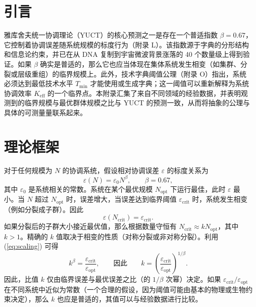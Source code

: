 \documentclass[12pt]{article}
\theoremstyle{remark}
\newcommand{\Keff}{K_{\mathrm{eff}}}
\newcommand{\Tmin}{T_{\min}}
\begin{document}
	\tableofcontents
	\newpage
	
	\section{引言}
	\label{sec:intro}
	
	雅库舍夫统一协调理论（YUCT）的核心预测之一是存在一个普适指数 $\beta = 0.67$，它控制着协调误差随系统规模的标度行为（附录 L）。该指数源于字典的分形结构和信息论约束，并已在从 DNA 复制到宇宙微波背景涨落的 40 个数量级上得到验证。如果 $\beta$ 确实是普适的，那么它也应当体现在集体系统发生相变（如集群、分裂或层级重组）的临界规模上。此外，技术字典阈值公理（附录 O）指出，系统必须达到最低技术水平 $\Tmin$ 才能使用或生成字典；这一阈值可以重新解释为系统协调效率 $\Keff$ 的一个临界点。本附录汇集了来自不同领域的经验数据，并表明观测到的临界规模与最优群体规模之比与 YUCT 的预测一致，从而将抽象的公理与具体的可测量量联系起来。
	
	\section{理论框架}
	\label{sec:theory}
	
	对于任何规模为 $N$ 的协调系统，假设相对协调误差 $\varepsilon$ 的标度关系为
	\begin{equation}
		\varepsilon(N) = \varepsilon_0 N^{\beta}, \qquad \beta = 0.67,
		\label{eq:scaling}
	\end{equation}
	其中 $\varepsilon_0$ 是系统相关的常数。系统在某个最优规模 $N_{\text{opt}}$ 下运行最佳，此时 $\varepsilon$ 最小。当 $N$ 超过 $N_{\text{opt}}$ 时，误差增大，当误差达到临界阈值 $\varepsilon_{\text{crit}}$ 时，系统发生相变（例如分裂成子群）。因此
	\begin{equation}
		\varepsilon(N_{\text{crit}}) = \varepsilon_{\text{crit}}.
	\end{equation}
	如果分裂后的子群大小接近最优值，那么根据数量守恒有 $N_{\text{crit}} \approx k N_{\text{opt}}$，其中 $k > 1$。精确的 $k$ 值取决于相变的性质（对称分裂或非对称分裂）。利用 (\ref{eq:scaling}) 可得
	\begin{equation}
		k^{\beta} = \frac{\varepsilon_{\text{crit}}}{\varepsilon_{\text{opt}}}, 
		\qquad\text{因此}\qquad 
		k = \left( \frac{\varepsilon_{\text{crit}}}{\varepsilon_{\text{opt}}} \right)^{1/\beta}.
		\label{eq:k}
	\end{equation}
	因此，比值 $k$ 仅由临界误差与最优误差之比（的 $1/\beta$ 次幂）决定。如果 $\varepsilon_{\text{crit}}/\varepsilon_{\text{opt}}$ 在不同系统中近似为常数（一个合理的假设，因为阈值可能由基本的物理或生物约束决定），那么 $k$ 也应是普适的，其值可以与经验数据进行比较。
	
\end{document}
